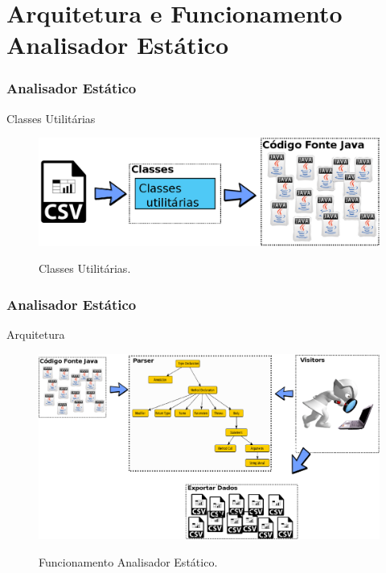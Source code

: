 \documentclass[]{beamer}
\begin{document}
		
	

\section{Arquitetura e Funcionamento Analisador Estático}


\begin{frame}[label=metodologia, fragile]
	\frametitle{Analisador Estático}
	\begin{block}{Classes Utilitárias}
			\begin{figure}[h]
				\center
				\includegraphics[scale=0.50]{../TCC/Imagens/InputArquitetura}
				\label{fig:oportunidadesSwitchString}
				\caption{Classes Utilitárias.}
			\end{figure}
	\end{block}
\end{frame}


\begin{frame}[label=metodologia, fragile]
	\frametitle{Analisador Estático}
	\begin{block}{Arquitetura}
			\begin{figure}[h]
				\center
				\includegraphics[scale=0.30]{../TCC/Imagens/FuncionamentoVisitor}
				\label{fig:oportunidadesSwitchString}
				\caption{Funcionamento Analisador Estático.}
			\end{figure}
	\end{block}
\end{frame}
\end{document}
